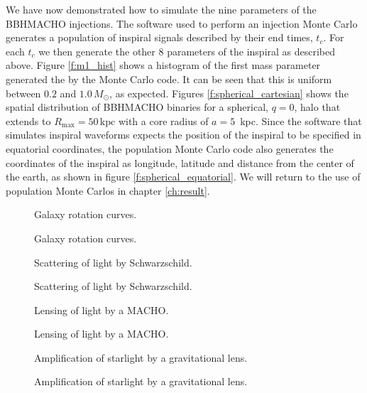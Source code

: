 We have now demonstrated how to simulate the nine parameters of the BBHMACHO
injections. The software used to perform an injection Monte Carlo generates a
population of inspiral signals described by their end times, $t_c$. For each
$t_c$ we then generate the other 8 parameters of the inspiral as described
above. Figure \ref{f:m1_hist} shows a histogram of the first mass parameter
generated the by the Monte Carlo code. It can be seen that this is uniform
between $0.2$ and $1.0\,M_\odot$, as expected. Figures
\ref{f:spherical_cartesian} shows the spatial distribution of BBHMACHO
binaries for a spherical, $q=0$, halo that extends to $R_\mathrm{max} =
50\,\mathrm{kpc}$ with a core radius of $a = 5$~kpc.  Since the software that
simulates inspiral waveforms expects the position of the inspiral to be
specified in equatorial coordinates, the population Monte Carlo code also
generates the coordinates of the inspiral as longitude, latitude and distance
from the center of the earth, as shown in figure \ref{f:spherical_equatorial}.
We will return to the use of population Monte Carlos in chapter
\ref{ch:result}.

\newpage

\begin{figure}[p]
\begin{center}
Galaxy rotation curves.
\end{center}
\caption{\label{f:rotcurves}%
Galaxy rotation curves.
}
\end{figure}

\begin{figure}[p]
\begin{center}
Scattering of light by Schwarzschild.
\end{center}
\caption{\label{f:scattering}%
Scattering of light by Schwarzschild.
}
\end{figure}

\begin{figure}[p]
\begin{center}
Lensing of light by a MACHO.
\end{center}
\caption{\label{f:macholens}%
Lensing of light by a MACHO.
}
\end{figure}

\begin{figure}[p]
\begin{center}
Amplification of starlight by a gravitational lens.
\end{center}
\caption{\label{f:lightcurves}%
Amplification of starlight by a gravitational lens.
}
\end{figure}

